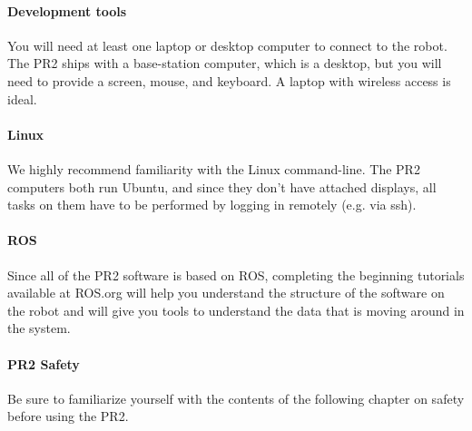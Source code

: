\paragraph{Development tools}
You will need at least one laptop or desktop computer to connect to the robot.  The PR2 ships with a base-station computer, which is a desktop, but you will need to provide a screen, mouse, and keyboard.  A laptop with wireless access is ideal.
\paragraph{Linux} We highly recommend familiarity with the Linux command-line.  The PR2 computers both run Ubuntu, and since they don't have attached displays, all tasks on them have to be performed by logging in remotely (e.g. via ssh).
\paragraph{ROS} Since all of the PR2 software is based on ROS, completing the beginning tutorials available at ROS.org will help you understand the structure of the software on the robot and will give you tools to understand the data that is moving around in the system.
\paragraph{PR2 Safety} Be sure to familiarize yourself with the contents of the following chapter on safety before using the PR2.
